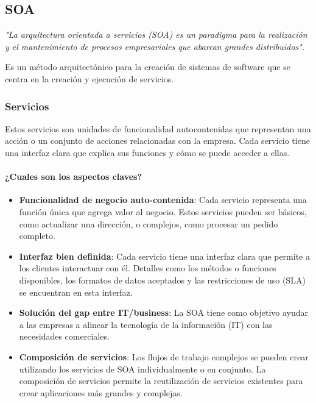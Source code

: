 \documentclass{article}
\begin{document}
		\subsection{SOA}
		\textit{"La arquitectura orientada a servicios (SOA) es un paradigma para la realización y el mantenimiento de procesos empresariales que abarcan grandes distribuidos".}
		
		Es un método arquitectónico para la creación de sistemas de software que se centra en la creación y ejecución de servicios. 
		
		
		\subsubsection{Servicios}
		Estos servicios son unidades de funcionalidad autocontenidas que representan una acción o un conjunto de acciones relacionadas con la empresa. Cada servicio tiene una interfaz clara que explica sus funciones y cómo se puede acceder a ellas.
		
		\paragraph{¿Cuales son los aspectos claves?}
		\begin{itemize}		
			\item \textbf{Funcionalidad de negocio auto-contenida}: Cada servicio representa una función única que agrega valor al negocio. Estos servicios pueden ser básicos, como actualizar una dirección, o complejos, como procesar un pedido completo.
			
			
			\item \textbf{Interfaz bien definida}: Cada servicio tiene una interfaz clara que permite a los clientes interactuar con él. Detalles como los métodos o funciones disponibles, los formatos de datos aceptados y las restricciones de uso (SLA) se encuentran en esta interfaz.
			
			
			\item \textbf{Solución del gap entre IT/business}: La SOA tiene como objetivo ayudar a las empresas a alinear la tecnología de la información (IT) con las necesidades comerciales.
			
			
			\item \textbf{Composición de servicios}: Los flujos de trabajo complejos se pueden crear utilizando los servicios de SOA individualmente o en conjunto. La composición de servicios permite la reutilización de servicios existentes para crear aplicaciones más grandes y complejas.
			
		\end{itemize}
		
\end{document}
